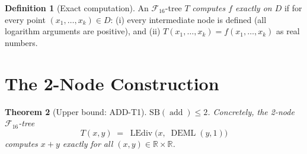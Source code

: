 \documentclass[12pt,a4paper]{article}
\newtheorem{theorem}{Theorem}[section]
\theoremstyle{definition}
\newtheorem{definition}[theorem]{Definition}
\newcommand{\DEML}{\operatorname{DEML}}
\newcommand{\LEdiv}{\operatorname{LEdiv}}
\newcommand{\addop}{\operatorname{add}}
\newcommand{\SB}{\mathrm{SB}}
\newcommand{\F}{\mathcal{F}_{16}}
\newcommand{\R}{\mathbb{R}}
\begin{document}
\begin{definition}[Exact computation]
\label{def:exact}
An $\F$-tree $T$ \emph{computes $f$ exactly on $D$} if for every point
$(x_1, \ldots, x_k) \in D$: (i) every intermediate node is defined (all
logarithm arguments are positive), and (ii) $T(x_1,\ldots,x_k) = f(x_1,\ldots,x_k)$
as real numbers.
\end{definition}

\section{The 2-Node Construction}
\label{sec:construction}

\begin{theorem}[Upper bound: ADD-T1]
\label{thm:construction}
$\SB(\addop) \le 2$.
Concretely, the 2-node $\F$-tree
\[
  T(x,y) \;=\; \LEdiv\!\bigl(x,\; \DEML(y, 1)\bigr)
\]
computes $x + y$ exactly for all $(x, y) \in \R \times \R$.
\end{theorem}
\end{document}
